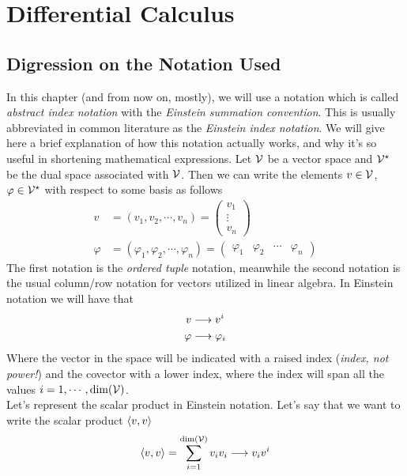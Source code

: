 \documentclass[../complete.tex]{subfiles}
\begin{document}
\chapter{Differential Calculus}
\section{Digression on the Notation Used}
In this chapter (and from now on, mostly), we will use a notation which is called \textit{abstract index notation} with the \textit{Einstein summation convention}. This is usually abbreviated in common literature as the \textit{Einstein index notation}. We will give here a brief explanation of how this notation actually works, and why it's so useful in shortening mathematical expressions. Let $\mathcal{V}$ be a vector space and $\mathcal{V}^\star$ be the dual space associated with $\mathcal{V}$. Then we can write the elements $v\in\mathcal{V}$, $\varphi\in\mathcal{V}^\star$ with respect to some basis as follows
\begin{equation}
	\begin{aligned}
		v&=(v_1,v_2,\cdots,v_n)=\begin{pmatrix}v_1\\\vdots\\v_n\end{pmatrix}\\
		\varphi&=(\varphi_1,\varphi_2,\cdots,\varphi_n)=\begin{pmatrix}\varphi_1&\varphi_2&\cdots&\varphi_n\end{pmatrix}
	\end{aligned}
	\label{eq:contrcovvector}
\end{equation}
The first notation is the \textit{ordered tuple} notation, meanwhile the second notation is the usual column/row notation for vectors utilized in linear algebra. In Einstein notation we will have that
\begin{equation}
	\begin{aligned}
		v&\overset{}{\longrightarrow} v^i\\
		\varphi&\overset{}{\longrightarrow} \varphi_i
	\end{aligned}
	\label{eq:einsteinnot1}
\end{equation}
Where the vector in the space will be indicated with a raised index (\emph{index, not power!}) and the covector with a lower index, where the index will span all the values $i=1,\cdots,\dim(\mathcal{V})$.\\
Let's represent the scalar product in Einstein notation. Let's say that we want to write the scalar product $\langle v, v \rangle$
\begin{equation}
	\langle v, v \rangle=\sum_{i=1}^{\dim(\mathcal{V})}v_iv_i\overset{}{\longrightarrow} v_iv^i
	\label{eq:spreinstein2}
\end{equation}
\end{document}
